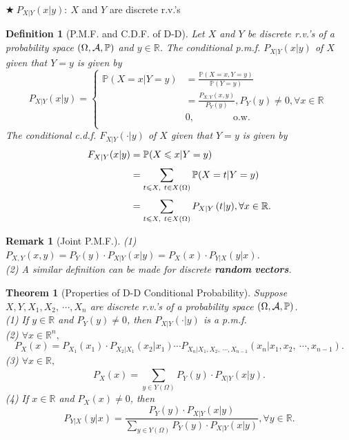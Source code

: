 \documentclass[openany,12pt]{book}
\newtheorem{theorem}{Theorem}[chapter]
\newtheorem{remark}{Remark}[chapter]
\newtheorem{definition}{Definition}[chapter]
\begin{document}
$\bigstar\ P_{X|Y}(x|y):\ X$ and $Y$ are discrete r.v.'s

\begin{definition}[P.M.F. and C.D.F. of D-D]
Let $X$ and $Y$ be discrete r.v.'s of a probability space
$(\Omega,\mathcal{A},\mathbb{P})$ and $y \in \mathbb{R}$. The conditional p.m.f. $P_{X|Y}(x|y)$ of $X$ given that $Y = y$ is given by
\[P_{X|Y}(x|y) = \left\{ \begin{aligned}
\mathbb{P}( X = x | Y = y ) &= \frac{\mathbb{P}(X = x,Y = y)}{\mathbb{P}(Y = y)} \\
&= \frac{P_{X,Y}(x,y)}{P_{Y}(y)},P_{Y}(y) \neq 0,\forall x \in \mathbb{R} \\
&0, \qquad\qquad\mathrm{\text{o.w.}}\\
\end{aligned} \right.\ \]
The conditional c.d.f. $F_{X|Y}\left( \cdot | y \right)$ of $X$ given that $Y = y$ is given by
\[\begin{aligned}
F_{X|Y}(x|y) &= \mathbb{P}( X \leqslant x | Y = y )\\
& = \sum_{t \leqslant X,\ t \in X(\Omega)}^{}{\mathbb{P}( X = t | Y = y )} \\
&= \sum_{t \leqslant X,\ t \in X(\Omega)}^{}{P_{X|Y}\left( t | y \right)},\forall x \in \mathbb{R}.
\end{aligned}\]
\end{definition}

\begin{remark}[Joint P.M.F.]
(1) $P_{X,Y}(x,y) = P_{Y}(y) \cdot P_{X|Y}(x|y) = P_{X}(x) \cdot P_{Y|X}(y|x)$.\\
(2) A similar definition can be made for discrete \textbf{random} \textbf{vectors}.
\end{remark}

\begin{theorem}[Properties of D-D Conditional Probability]
Suppose $X,Y,X_{1},X_{2},\ \cdots,X_{n}$ are discrete r.v.'s of a
probability space $(\Omega,\mathcal{A},\mathbb{P})$.\\
(1) If $y \in \mathbb{R}$ and $P_{Y}(y) \neq 0$, then $P_{X|Y}\left( \cdot | y \right)$ is a p.m.f.\\
(2) $\forall x \in \mathbb{R}^{n},$
 \[P_{X}(x) = P_{X_{1}}(x_{1}) \cdot P_{X_{2}|X_{1}}\left( x_{2}|x_{1} \right) \cdots P_{X_{n}|X_{1},X_{2},\ \cdots,X_{n - 1}}\left( x_{n}|x_{1},x_{2},\ \cdots,x_{n - 1} \right).\]
(3) $\forall x \in \mathbb{R},$
\[P_{X}(x) = \sum_{y \in Y(\Omega)}^{}{P_{Y}(y)} \cdot P_{X|Y}(x|y).\]
(4) If $x \in \mathbb{R}$ and $P_{X}(x) \neq 0$, then
\[P_{Y|X}(y|x) = \frac{P_{Y}(y) \cdot P_{X|Y}(x|y)}{\sum_{y \in Y(\Omega)}^{}{P_{Y}(y)} \cdot P_{X|Y}(x|y)},\forall y \in \mathbb{R}.\]
\end{theorem}
\end{document}
